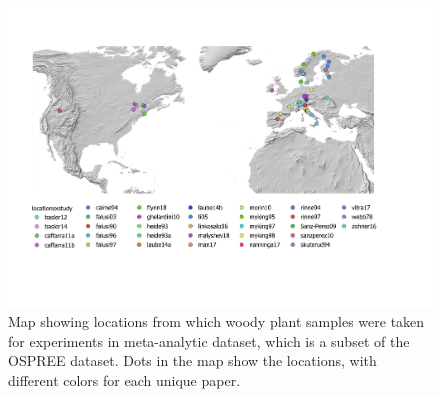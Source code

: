 \documentclass[11pt]{article}
\begin{document}
\begin{figure}
  \begin{center}
  \includegraphics[width=14cm]{../../analyses/phylogeny/figures/FigSXXXX_map_study_locations_legend.pdf}
  \caption{Map showing locations from which woody plant samples were taken for experiments in meta-analytic dataset, which is a subset of the OSPREE dataset. Dots in the map show the locations, with different colors for each unique paper.} %
  \label{fig:mapstudylocations}
  \end{center}
\end{figure}
\clearpage
\end{document}
